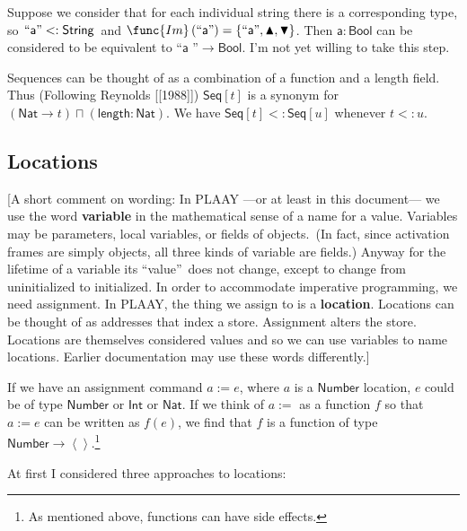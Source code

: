 \documentclass[12pt]{article}
\begin{document}
Suppose we consider that for each individual string there is a corresponding
type, so $\left. \text{\textquotedblleft }\mathsf{a}\text{\textquotedblright 
}<:\mathsf{String}\right. $ and $\func{Im}\left( \text{\textquotedblleft }%
\mathsf{a}\text{\textquotedblright }\right) =\left\{ \text{\textquotedblleft 
}\mathsf{a}\text{\textquotedblright },\blacktriangle ,\blacktriangledown
\right\} $. Then $\mathsf{a}$\textsf{$\colon $}$\mathsf{Bool}$ can be
considered to be equivalent to \textquotedblleft $\mathsf{a}$%
\textquotedblright $\rightarrow \mathsf{Bool}$. I'm not yet willing to take
this step.

Sequences can be thought of as a combination of a function and a length
field. Thus (Following Reynolds [[1988]]) $\mathsf{Seq}[t]$ is a synonym for 
$\left( \mathsf{Nat}\rightarrow t\right) \sqcap \left( \mathsf{length:Nat}%
\right) $. We have $\mathsf{Seq}[t]<:\mathsf{Seq}[u]$ whenever $t<:u$.

\subsection{Locations}

[A short comment on wording: In PLAAY ---or at least in this document--- we
use the word \textbf{variable} in the mathematical sense of a name for a
value. Variables may be parameters, local variables, or fields of objects.\
(In fact, since activation frames are simply objects, all three kinds of
variable are fields.) Anyway for the lifetime of a variable its
\textquotedblleft value\textquotedblright\ does not change, except to change
from uninitialized to initialized. In order to accommodate imperative
programming, we need assignment. In PLAAY, the thing we assign to is a 
\textbf{location}. Locations can be thought of as addresses that index a
store. Assignment alters the store. Locations are themselves considered
values and so we can use variables to name locations. Earlier documentation
may use these words differently.]

If we have an assignment command $a:=e$, where $a$ is a $\mathsf{Number}$
location, $e$ could be of type $\mathsf{Number}$ or $\mathsf{Int}$ or $%
\mathsf{Nat}$. If we think of $a:=$ as a function $f$ so that $a:=e$ can be
written as $f(e)$, we find that $f$ is a function of type $\mathsf{Number}%
\rightarrow \left\langle {}\right\rangle $.\footnote{%
As mentioned above, functions can have side effects.}

At first I considered three approaches to locations:
\end{document}
